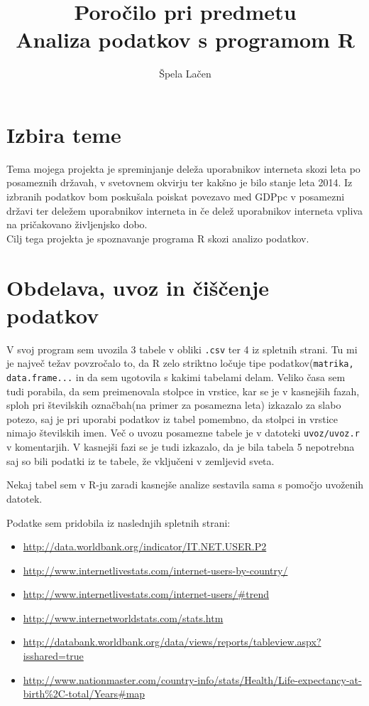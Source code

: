 \documentclass[11pt,a4paper]{article}
\begin{document}
\author{Špela Lačen}
\title{Poročilo pri predmetu \\
Analiza podatkov s programom R}
\maketitle

\section{Izbira teme}

Tema mojega projekta je spreminjanje deleža uporabnikov interneta skozi leta po posameznih državah, v svetovnem okvirju ter kakšno je bilo stanje leta 2014. Iz izbranih podatkov bom poskušala poiskat povezavo med  GDPpc v posamezni državi ter deležem uporabnikov interneta in če delež uporabnikov interneta vpliva na pričakovano življenjsko dobo.
\\ Cilj tega projekta je spoznavanje programa R skozi analizo podatkov.



\section{Obdelava, uvoz in čiščenje podatkov}

V svoj program sem uvozila 3 tabele  v obliki \verb|.csv| ter 4 iz spletnih strani. Tu mi je največ težav povzročalo to, da R zelo striktno ločuje tipe podatkov\-(\verb|matrika, data.frame...| in da sem ugotovila s kakimi tabelami delam. Veliko časa sem tudi porabila, da sem preimenovala stolpce in vrstice, kar se je v kasnejših fazah, sploh pri številskih označbah(na primer za posamezna leta) izkazalo za slabo potezo, saj je pri uporabi podatkov iz tabel pomembno, da stolpci in vrstice nimajo številskih imen. Več o uvozu posamezne tabele je v datoteki \verb|uvoz/uvoz.r| v komentarjih. V kasnejši fazi se je tudi izkazalo, da je bila tabela 5 nepotrebna saj so bili podatki iz te tabele, že vključeni v zemljevid sveta.

Nekaj tabel sem v R-ju zaradi kasnejše analize sestavila sama s pomočjo uvoženih datotek.

Podatke sem pridobila iz naslednjih spletnih strani:
\begin{itemize} 
\item \url{http://data.worldbank.org/indicator/IT.NET.USER.P2}
\item \url{http://www.internetlivestats.com/internet-users-by-country/}
\item \url{http://www.internetlivestats.com/internet-users/#trend}
\item \url{http://www.internetworldstats.com/stats.htm}
\item \url{http://databank.worldbank.org/data/views/reports/tableview.aspx?isshared=true}
\item \url{http://www.nationmaster.com/country-info/stats/Health/Life-expectancy-at-birth%2C-total/Years#map}

\end {itemize}
\end{document}
